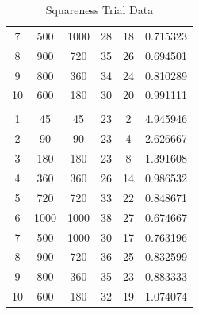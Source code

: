 \documentclass[10pt]{article}
\begin{document}
\begin{table}[H]
\begin{tabular}{cccccc}
        7  & 500  & 1000 & 28 & 18 & 0.715323 \\
        8  & 900  & 720  & 35 & 26 & 0.694501 \\
        9  & 800  & 360  & 34 & 24 & 0.810289 \\
        10 & 600  & 180  & 30 & 20 & 0.991111 \\
           &      &      &    &    & \\
        1  & 45   & 45   & 23 & 2  & 4.945946 \\
        2  & 90   & 90   & 23 & 4  & 2.626667 \\
        3  & 180  & 180  & 23 & 8  & 1.391608 \\
        4  & 360  & 360  & 26 & 14 & 0.986532 \\
        5  & 720  & 720  & 33 & 22 & 0.848671 \\
        6  & 1000 & 1000 & 38 & 27 & 0.674667 \\
        7  & 500  & 1000 & 30 & 17 & 0.763196 \\
        8  & 900  & 720  & 36 & 25 & 0.832599 \\
        9  & 800  & 360  & 35 & 23 & 0.883333 \\
        10 & 600  & 180  & 32 & 19 & 1.074074 \\

        \bottomrule
    \end{tabular}
    \caption{Squareness Trial Data}
\end{table}
\end{document}
